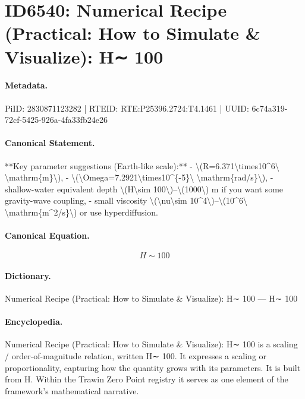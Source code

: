 \section*{ID6540: Numerical Recipe (Practical: How to Simulate \& Visualize): H∼ 100}
\paragraph{Metadata.}
PiID: 2830871123282 | RTEID: RTE:P25396.2724:T4.1461 | UUID: 6c74a319-72cf-5425-926a-4fa33fb24e26

\paragraph{Canonical Statement.}
**Key parameter suggestions (Earth-like scale):** - \textbackslash{}(R=6.371\textbackslash{}times10\textasciicircum{}6\textbackslash{} \textbackslash{}mathrm\{m\}\textbackslash{}), - \textbackslash{}(\textbackslash{}Omega=7.2921\textbackslash{}times10\textasciicircum{}\{-5\}\textbackslash{} \textbackslash{}mathrm\{rad/s\}\textbackslash{}), - shallow-water equivalent depth \textbackslash{}(H\textbackslash{}sim 100\textbackslash{})–\textbackslash{}(1000\textbackslash{}) m if you want some gravity-wave coupling, - small viscosity \textbackslash{}(\textbackslash{}nu\textbackslash{}sim 10\textasciicircum{}4\textbackslash{})–\textbackslash{}(10\textasciicircum{}6\textbackslash{} \textbackslash{}mathrm\{m\textasciicircum{}2/s\}\textbackslash{}) or use hyperdiffusion.

\paragraph{Canonical Equation.}
\[
H\sim 100
\]

\paragraph{Dictionary.}
Numerical Recipe (Practical: How to Simulate \& Visualize): H∼ 100 — H∼ 100

\paragraph{Encyclopedia.}
Numerical Recipe (Practical: How to Simulate \& Visualize): H∼ 100 is a scaling / order-of-magnitude relation, written H∼ 100. It expresses a scaling or proportionality, capturing how the quantity grows with its parameters. It is built from H. Within the Trawin Zero Point registry it serves as one element of the framework's mathematical narrative.
